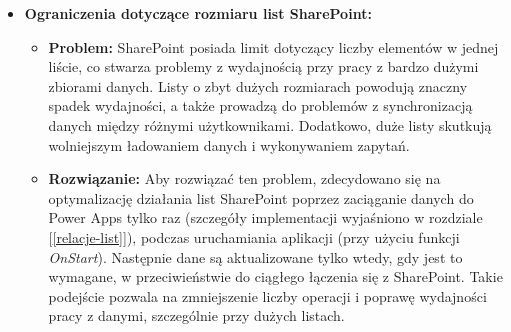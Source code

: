 \begin{itemize}
    \item \textbf{Ograniczenia dotyczące rozmiaru list SharePoint:}
          \begin{itemize}
              \item \textbf{Problem:} SharePoint posiada limit dotyczący liczby elementów w jednej liście, co stwarza problemy z wydajnością przy pracy z bardzo dużymi zbiorami danych. Listy o zbyt dużych rozmiarach powodują znaczny spadek wydajności, a także prowadzą do problemów z synchronizacją danych między różnymi użytkownikami. Dodatkowo, duże listy skutkują wolniejszym ładowaniem danych i wykonywaniem zapytań.
              \item \textbf{Rozwiązanie:} Aby rozwiązać ten problem, zdecydowano się na optymalizację działania list SharePoint poprzez zaciąganie danych do Power Apps tylko raz (szczegóły implementacji wyjaśniono w rozdziale [\ref{relacje-list}]), podczas uruchamiania aplikacji (przy użyciu funkcji \emph{OnStart}). Następnie dane są aktualizowane tylko wtedy, gdy jest to wymagane, w przeciwieństwie do ciągłego łączenia się z SharePoint. Takie podejście pozwala na zmniejszenie liczby operacji i poprawę wydajności pracy z danymi, szczególnie przy dużych listach.
          \end{itemize}
\end{itemize}
